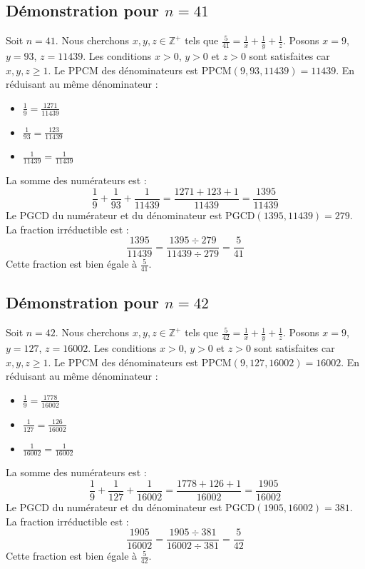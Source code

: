 \documentclass[11pt,a4paper]{article}
\begin{document}
\subsection{Démonstration pour $n = 41$}
Soit $n = 41$. Nous cherchons $x, y, z \in \mathbb{Z}^{+}$ tels que $\frac{5}{41} = \frac{1}{x} + \frac{1}{y} + \frac{1}{z}$.
Posons $x = 9$, $y = 93$, $z = 11439$.
Les conditions $x > 0$, $y > 0$ et $z > 0$ sont satisfaites car $x, y, z \geq 1$.
Le PPCM des dénominateurs est $\text{PPCM}(9, 93, 11439) = 11439$.
En réduisant au même dénominateur :
\begin{itemize}
    \item $\frac{1}{9} = \frac{1271}{11439}$
    \item $\frac{1}{93} = \frac{123}{11439}$
    \item $\frac{1}{11439} = \frac{1}{11439}$
\end{itemize}
La somme des numérateurs est :
$$ \frac{1}{9} + \frac{1}{93} + \frac{1}{11439} = \frac{1271 + 123 + 1}{11439} = \frac{1395}{11439} $$
Le PGCD du numérateur et du dénominateur est $\text{PGCD}(1395, 11439) = 279$.
La fraction irréductible est :
$$ \frac{1395}{11439} = \frac{1395 \div 279}{11439 \div 279} = \frac{5}{41} $$
Cette fraction est bien égale à $\frac{5}{41}$.

\subsection{Démonstration pour $n = 42$}
Soit $n = 42$. Nous cherchons $x, y, z \in \mathbb{Z}^{+}$ tels que $\frac{5}{42} = \frac{1}{x} + \frac{1}{y} + \frac{1}{z}$.
Posons $x = 9$, $y = 127$, $z = 16002$.
Les conditions $x > 0$, $y > 0$ et $z > 0$ sont satisfaites car $x, y, z \geq 1$.
Le PPCM des dénominateurs est $\text{PPCM}(9, 127, 16002) = 16002$.
En réduisant au même dénominateur :
\begin{itemize}
    \item $\frac{1}{9} = \frac{1778}{16002}$
    \item $\frac{1}{127} = \frac{126}{16002}$
    \item $\frac{1}{16002} = \frac{1}{16002}$
\end{itemize}
La somme des numérateurs est :
$$ \frac{1}{9} + \frac{1}{127} + \frac{1}{16002} = \frac{1778 + 126 + 1}{16002} = \frac{1905}{16002} $$
Le PGCD du numérateur et du dénominateur est $\text{PGCD}(1905, 16002) = 381$.
La fraction irréductible est :
$$ \frac{1905}{16002} = \frac{1905 \div 381}{16002 \div 381} = \frac{5}{42} $$
Cette fraction est bien égale à $\frac{5}{42}$.
\end{document}
